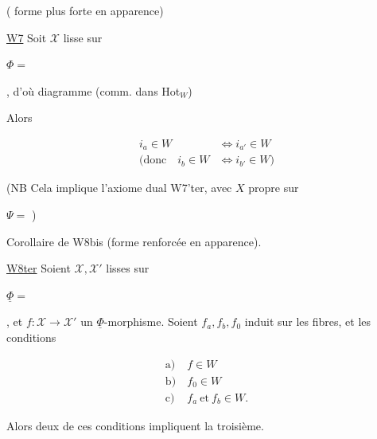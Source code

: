 
 ( forme plus forte en apparence)

\uline{W7} Soit $\mathcal X$ lisse sur

$\Phi={}$

, d'où diagramme (comm. dans Hot$_W$)


Alors

\[
\begin{aligned}
i_a\in W&\Longleftrightarrow i_{a'}\in W\\
(\text{donc}\quad i_b\in W&\Longleftrightarrow i_{b'}\in W)
\end{aligned}
\]

(NB Cela implique l'axiome dual W7'ter, avec $X$ propre sur

$\Psi={}$ )

Corollaire de W8bis (forme renforcée en apparence).

\uline{W8ter} Soient $\mathcal X,\mathcal X'$ lisses sur

$\underline\Phi={}$

, et $f\colon\mathcal X\longrightarrow\mathcal X'$ un $\underline\Phi$-morphisme. Soient $f_a,f_b,f_0$ induit sur les fibres, et les conditions

\[
\begin{aligned}
\text{a)}\ & f\in W\\
\text{b)}\ & f_0\in W\\
\text{c)}\ & f_a\ \text{et}\ f_b\in W.
\end{aligned}
\]

Alors deux de ces conditions impliquent la troisième.
